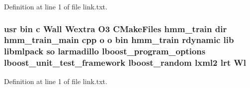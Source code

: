 Definition at line 1 of file link.\-txt.

\subsubsection[{Wl}]{\setlength{\rightskip}{0pt plus 5cm}usr bin c Wall Wextra O3 C\-Make\-Files hmm\-\_\-train dir hmm\-\_\-train\-\_\-main cpp o o bin hmm\-\_\-train rdynamic lib libmlpack so larmadillo lboost\-\_\-program\-\_\-options lboost\-\_\-unit\-\_\-test\-\_\-framework lboost\-\_\-random lxml2 lrt Wl}\label{methods_2hmm_2CMakeFiles_2hmm__train_8dir_2link_8txt_aca59588bd1f4b78ade3033f72e1bd5b4}


Definition at line 1 of file link.\-txt.

